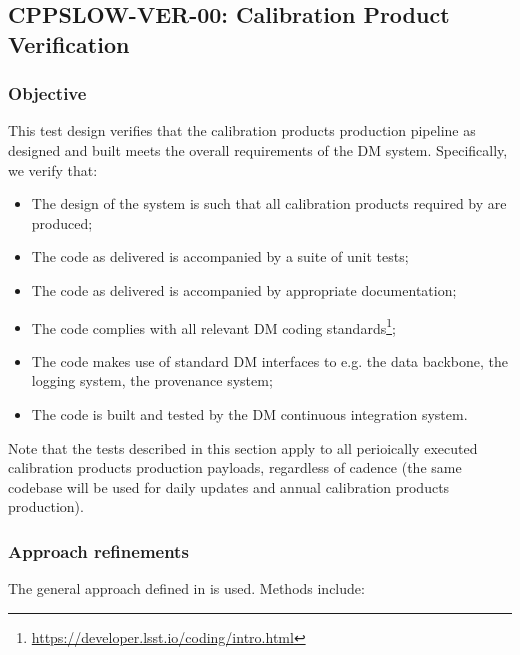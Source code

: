 \subsection{CPPSLOW-VER-00: Calibration Product Verification}
\label{cppslow-ver-00}

\subsubsection{Objective}

This test design verifies that the calibration products production pipeline as
designed and built meets the overall requirements of the DM system.
Specifically, we verify that:

\begin{itemize}

  \item{The design of the system is such that all calibration products
  required by  are produced;}

  \item{The code as delivered is accompanied by a suite of unit tests;}

  \item{The code as delivered is accompanied by appropriate documentation;}

  \item{The code complies with all relevant DM coding
  standards\footnote{\url{https://developer.lsst.io/coding/intro.html}};}

  \item{The code makes use of standard DM interfaces to e.g. the data
  backbone, the logging system, the provenance system;}

  \item{The code is built and tested by the DM continuous integration system.}

\end{itemize}

Note that the tests described in this section apply to all perioically
executed calibration products production payloads, regardless of cadence (the
same codebase will be used for daily updates and annual calibration products
production).

\subsubsection{Approach refinements}

The general approach defined in  is used. Methods include:

